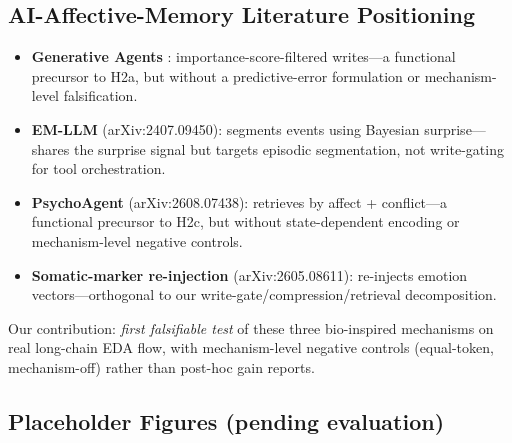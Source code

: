\subsection{AI-Affective-Memory Literature Positioning}

{\sloppy\begin{itemize}[noitemsep,topsep=0pt]
    \item \textbf{Generative Agents} \cite{park2023}: importance-score-filtered writes---a functional precursor to H2a, but without a predictive-error formulation or mechanism-level falsification.
    \item \textbf{EM-LLM} (arXiv:2407.09450): segments events using Bayesian surprise---shares the surprise signal but targets episodic segmentation, not write-gating for tool orchestration.
    \item \textbf{PsychoAgent} (arXiv:2608.07438): retrieves by affect + conflict---a functional precursor to H2c, but without state-dependent encoding or mechanism-level negative controls.
    \item \textbf{Somatic-marker re-injection} (arXiv:2605.08611): re-injects emotion vectors---orthogonal to our write-gate/compression/retrieval decomposition.
\end{itemize}}

Our contribution: \emph{first falsifiable test} of these three bio-inspired mechanisms on real long-chain EDA flow, with mechanism-level negative controls (equal-token, mechanism-off) rather than post-hoc gain reports.

\subsection{Placeholder Figures (pending evaluation)}

